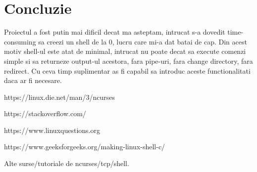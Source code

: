 \documentclass[runningheads]{llncs}
\begin{document}
\newpage
\section{Concluzie}
Proiectul a fost putin mai dificil decat ma asteptam, intrucat s-a dovedit time-consuming sa creezi un shell de la 0, lucru care mi-a dat batai de cap. Din acest motiv shell-ul este atat de minimal, intrucat nu poate decat sa execute comenzi simple si sa returneze output-ul acestora, fara pipe-uri, fara change directory, fara redirect. Cu ceva timp suplimentar as fi capabil sa introduc aceste functionalitati daca ar fi necesare.


\begin{thebibliography}{8}
https://linux.die.net/man/3/ncurses

https://stackoverflow.com/

https://www.linuxquestions.org

https://www.geeksforgeeks.org/making-linux-shell-c/

Alte surse/tutoriale de ncurses/tcp/shell.
\end{thebibliography}
\end{document}
